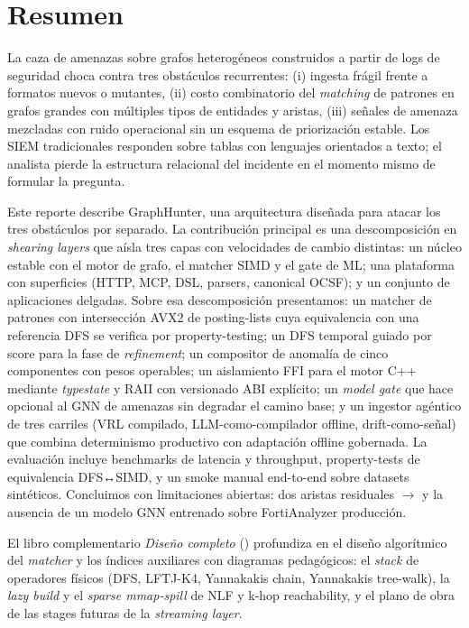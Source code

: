 \chapter*{Resumen}
\label{sec:resumen}

La caza de amenazas sobre grafos heterogéneos construidos a partir
de logs de seguridad choca contra tres obstáculos recurrentes:
(i) ingesta frágil frente a formatos nuevos o mutantes, (ii) costo
combinatorio del \emph{matching} de patrones en grafos grandes con
múltiples tipos de entidades y aristas, (iii) señales de amenaza
mezcladas con ruido operacional sin un esquema de priorización
estable. Los SIEM tradicionales responden sobre tablas con
lenguajes orientados a texto; el analista pierde la estructura
relacional del incidente en el momento mismo de formular la
pregunta.

Este reporte describe GraphHunter, una arquitectura diseñada para
atacar los tres obstáculos por separado. La contribución principal
es una descomposición en \emph{shearing layers} que aísla tres
capas con velocidades de cambio distintas: un núcleo estable con el
motor de grafo, el matcher SIMD y el gate de ML; una plataforma
con superficies (HTTP, MCP, DSL, parsers, canonical OCSF); y un
conjunto de aplicaciones delgadas. Sobre esa descomposición
presentamos: un matcher de patrones con intersección AVX2 de
posting-lists cuya equivalencia con una referencia DFS se verifica
por property-testing; un DFS temporal guiado por score para la fase
de \emph{refinement}; un compositor de anomalía de cinco
componentes con pesos operables; un aislamiento FFI para el motor
C++ mediante \emph{typestate} y RAII con versionado ABI explícito;
un \emph{model gate} que hace opcional al GNN de amenazas sin
degradar el camino base; y un ingestor agéntico de tres carriles
(VRL compilado, LLM-como-compilador offline, drift-como-señal) que
combina determinismo productivo con adaptación offline gobernada.
La evaluación incluye benchmarks de latencia y throughput,
property-tests de equivalencia DFS↔SIMD, y un smoke manual
end-to-end sobre datasets sintéticos. Concluimos con limitaciones
abiertas: dos aristas residuales $\to$ y
la ausencia de un modelo GNN entrenado sobre FortiAnalyzer
producción.

El libro complementario \emph{Diseño completo}
() profundiza en el diseño
algorítmico del \emph{matcher} y los índices auxiliares con
diagramas pedagógicos: el \emph{stack} de operadores físicos
(DFS, LFTJ-K4, Yannakakis chain, Yannakakis tree-walk), la
\emph{lazy build} y el \emph{sparse mmap-spill} de NLF y k-hop
reachability, y el plano de obra de las stages futuras de la
\emph{streaming layer}.
